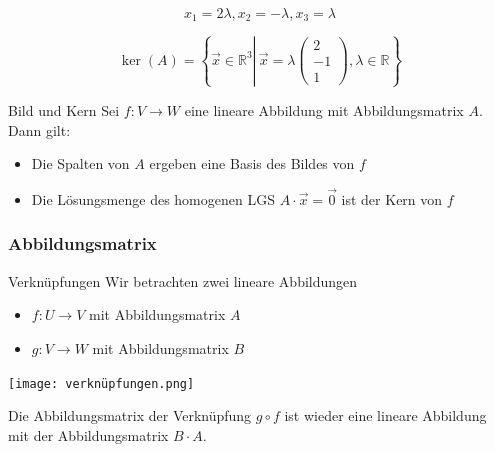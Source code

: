\begin{example}

    $$
    x_{1}=2 \lambda, x_{2}=-\lambda, x_{3}=\lambda
    $$

    $$
    \operatorname{ker}(A)=\left\{\vec{x} \in \mathbb{R}^{3} \left\lvert\, \vec{x}=\lambda\left(\begin{array}{c}
    2 \\
    -1 \\
    1
    \end{array}\right)\right., \lambda \in \mathbb{R}\right\}
    $$
\end{example}

\begin{theorem}{Bild und Kern}
    Sei $f: V \rightarrow W$ eine lineare Abbildung mit Abbildungsmatrix $A$. Dann gilt:
    \begin{itemize}
        \item Die Spalten von $A$ ergeben eine Basis des Bildes von $f$
        \item Die Lösungsmenge des homogenen LGS $A \cdot \vec{x} = \overrightarrow{0}$ ist der Kern von $f$
    \end{itemize}
\end{theorem}

\columnbreak

\subsubsection*{Abbildungsmatrix}

\begin{theorem}{Verknüpfungen}
    Wir betrachten zwei lineare Abbildungen
    \begin{itemize}
    \item $f: U \rightarrow V$ mit Abbildungsmatrix $A$
    \item $g: V \rightarrow W$ mit Abbildungsmatrix $B$
    \end{itemize}
    \begin{center}
    \texttt{[image: verknüpfungen.png]}\\
    \end{center}
    Die Abbildungsmatrix der Verknüpfung $g \circ f$ ist wieder eine lineare Abbildung mit der Abbildungsmatrix $B \cdot A$.
\end{theorem}

